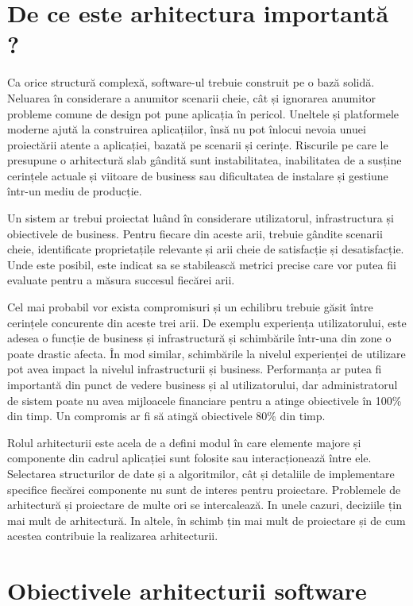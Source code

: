 \documentclass[12pt, a4paper, oneside, romanian]{teza-upb}
\begin{document}
\newpage
\section{De ce este arhitectura importantă ?}
Ca orice structură complexă, software-ul trebuie construit pe o bază solidă. Neluarea în considerare a anumitor scenarii cheie, cât și ignorarea anumitor probleme comune de design pot pune aplicația în pericol. Uneltele și platformele moderne ajută la construirea aplicațiilor, însă nu pot înlocui nevoia unuei proiectării atente a aplicației, bazată pe scenarii și cerințe. Riscurile pe care le presupune o arhitectură slab gândită sunt instabilitatea, inabilitatea de a susține cerințele actuale și viitoare de business sau dificultatea de instalare și gestiune într-un mediu de producție.

Un sistem ar trebui proiectat luând în considerare utilizatorul, infrastructura și obiectivele de business. Pentru fiecare din aceste arii, trebuie gândite scenarii cheie, identificate proprietațile relevante și arii cheie de satisfacție și desatisfacție. Unde este posibil, este indicat sa se stabilească metrici precise care vor putea fii evaluate pentru a măsura succesul fiecărei arii.

Cel mai probabil vor exista compromisuri și un echilibru trebuie găsit între cerințele concurente din aceste trei arii. De exemplu experiența utilizatorului, este adesea o funcție de business și infrastructură și schimbările într-una din zone o poate drastic afecta. În mod similar, schimbările la nivelul experienței de utilizare pot avea impact la nivelul infrastructurii și business. Performanța ar putea fi importantă din punct de vedere business și al utilizatorului, dar administratorul de sistem poate nu avea mijloacele financiare pentru a atinge obiectivele în 100\% din timp. Un compromis ar fi să atingă obiectivele 80\% din timp.

Rolul arhitecturii este acela de a defini modul în care elemente majore și componente din cadrul aplicației sunt folosite sau interacționează între ele. Selectarea structurilor de date și a algoritmilor, cât și detaliile de implementare specifice fiecărei componente nu sunt de interes pentru proiectare. Problemele de arhitectură și proiectare de multe ori se intercalează. In unele cazuri, deciziile țin mai mult de arhitectură. In altele, în schimb țin mai mult de proiectare și de cum acestea contribuie la realizarea arhitecturii.

\section{Obiectivele arhitecturii software}
\end{document}

